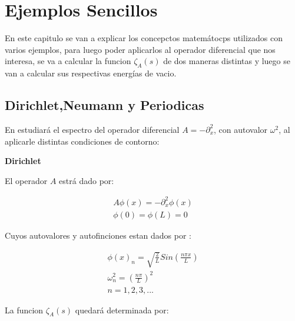 \chapter{Ejemplos Sencillos}

    
    En este capitulo se van a explicar los concepctos matemátocps utilizados con varios ejemplos, para luego poder aplicarlos al operador diferencial que nos interesa, se va a calcular la funcion $ \zeta _A (s) $ de dos maneras distintas y luego se van a calcular sus respectivas energías de vacio.

\section{Dirichlet,Neumann y Periodicas}

En estudiará el espectro del operador diferencial $A = - \partial ^2 _x$, con autovalor $\omega ^2$, al aplicarle distintas condiciones de contorno:

\textbf{Dirichlet}

El operador $A$ estrá dado por:

\begin{equation}
\begin{array}{c}
	A \phi (x) = - \partial _x ^2 \phi (x) \\
    \phi (0) = \phi(L) = 0 
\end{array}
\end{equation}



Cuyos autovalores y autofinciones estan dados por  : 

\begin{equation}
\begin{array}{c}
	\phi (x) _n = \sqrt{\frac{2}{L}} Sin( \frac{n \pi x}{L} ) \\
	\omega _n ^2 = \left( \frac{n \pi }{L} \right) ^2 \\
	n = 1,2,3, ...
\end{array}
\end{equation}

La funcion $\zeta _A (s)$ quedará determinada por:

